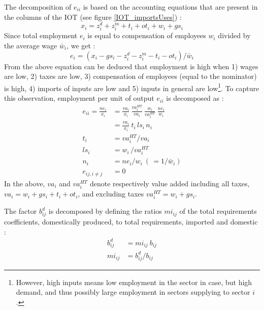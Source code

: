\documentclass[12pt,english]{article}
\newcommand{\mli}[1]{\mathit{#1}}
\begin{document}
The decomposition of $e_{ii}$ is based on the accounting equations that are present in the columns of the IOT (see figure \ref{IOT_importsUses}) :
\begin{equation}
x_i = z^d_i + z^m_i + t_i + ot_i + w_i + gs_i
\end{equation}
Since total employment $e_i$ is equal to compensation of employees $w_i$ divided by the average wage $\bar{w}_i$, we get :
\begin{equation}
 e_i = (x_i - gs_i - z^d_i - z^m_i - t_i - ot_i )/\bar{w}_i \label{empl_accounting}
\end{equation}
From the above equation can be deduced that employment is high when 1) wages are low, 2) taxes are low, 3) compensation of employees (equal to the nominator) is high, 4) imports of inputs are low and 5) inputs in general are low\footnote{However, high inputs means low employment in the sector in case, but high demand, and thus possibly large employment in sectors supplying to sector $i$.}. To capture this observation, employment per unit of output $e_{ii}$ is decomposed as :
\begin{align}
e_{ii} = \frac{ne_i}{x_i}&= \frac{va_i}{x_i} \ \frac{va^{HT}_i}{va_i}  \ \frac{w_i}{va^{HT}_i}  \ \frac{ne_i}{w_i} \nonumber \\
&= \frac{va_i}{x_i} \ t_i \, ls_i \, n_i \label{ECdecomp_e} \\
t_i &= va^{HT}_i/va_i \nonumber  \\
ls_i &= w_i\, /va^{HT}_i \nonumber \\
n_i &= \mli{ne}_i/w_i \  (\, =1/\bar{w}_i)	  \nonumber \\
e_{ij, i\neq j} &= 0		  \nonumber 
\end{align}
In the above, $va_i$ and $va_i^{HT}$ denote respectively value added including all taxes, $va_i= w_i + gs_i + t_i + ot_i$, and excluding taxes $va^{HT}_i= w_i + gs_i$.

The factor $b^d_{ij}$ is decomposed by defining the ratios $mi_{ij}$ of the total requirements coefficients, domestically produced, to total requirements, imported and domestic :
\begin{align}
b^d_{ij} &= mi_{ij} \ b_{ij} \label{ECdecomp_bd} \\
mi_{ij} &= b^d_{ij} / b_{ij} \nonumber
\end{align}
 
\end{document}
